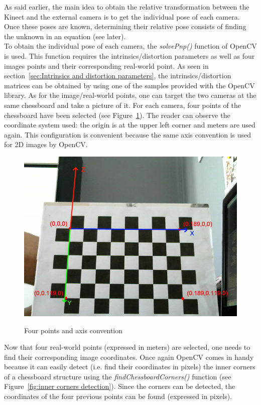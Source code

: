As said earlier, the main idea to obtain the relative transformation between the Kinect and the external camera is to get the individual pose of each camera. Once these poses are known, determining their relative pose consists of finding the unknown in an equation (see later).\\

To obtain the individual pose of each camera, the \textit{solvePnp()} function of OpenCV is used. This function requires the intrinsics/distortion parameters as well as four images points and their corresponding real-world point. As seen in section~\ref{sec:Intrinsics and distortion parameters}, the intrinsics/distortion matrices can be obtained by using one of the samples provided with the OpenCV library. As for the image/real-world points, one can target the two cameras at the same chessboard and take a picture of it. For each camera, four points of the chessboard have been selected (see Figure~\ref{fig:four points}). The reader can observe the coordinate system used: the origin is at the upper left corner and meters are used again. This configuration is convenient because the same axis convention is used for 2D images by OpenCV.\\

\begin{figure}
\caption{Four points and axis convention}
\centering
    \includegraphics[width=1.0\textwidth]{images/fourPoints.jpg}
\label{fig:four points}
\end{figure}

Now that four real-world points (expressed in meters) are selected, one needs to find their corresponding image coordinates. Once again OpenCV comes in handy because it can easily detect (i.e. find their coordinates in pixels) the inner corners of a chessboard structure using the \textit{findChessboardCorners()} function (see Figure~\ref{fig:inner corners detection}). Since the corners can be detected, the coordinates of the four previous points can be found (expressed in pixels).

